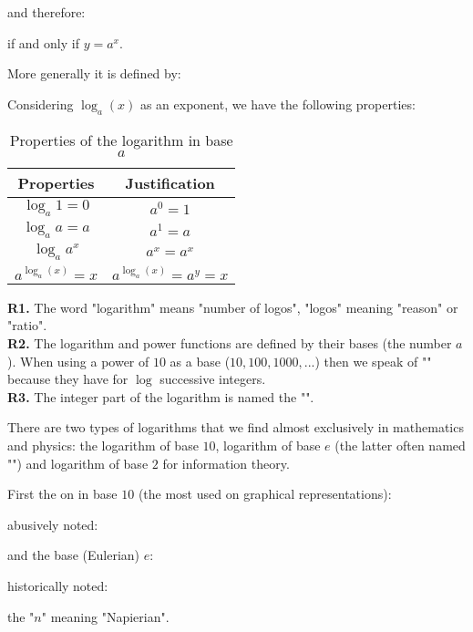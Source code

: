 	and therefore:
	
	if and only if $y=a^x$.
	
	More generally it is defined by:
	
	
	Considering $\log_a(x)$ as an exponent, we have the following properties:	
	\begin{table}[H]
	\begin{center}
		\begin{tabular}{|c|c|}
			  \hline
			  \rowcolor[gray]{0.75}Properties & Justification \\ \hline
			  $\log_a1=0$ & $a^0=1$ \\ \hline
			  $\log_aa=a$ & $a^1=a$ \\ \hline
			  $\log_aa^x$ & $a^x=a^x$ \\ \hline
			  $a^{\log_a(x)}=x$ & $a^{\log_a(x)}=a^y=x$ \\
			  \hline
		\end{tabular}
		\end{center}
		\caption{Properties of the logarithm in base $a$}
	\end{table}
	\begin{tcolorbox}[title=Remarks,colframe=black,arc=10pt]
	\textbf{R1.} The word "logarithm" means "number of logos", "logos" meaning "reason" or "ratio".\\
	
	\textbf{R2.} The logarithm and power functions are defined by their bases (the number $a$). When using a power of $10$ as a base ($10, 100, 1000, ...$) then we speak of "" because they have for $\log$ successive integers.\\
	
	\textbf{R3.} The integer part of the logarithm is named the "".
	\end{tcolorbox}
	There are two types of logarithms that we find almost exclusively in mathematics and physics: the logarithm of base $10$, logarithm of base $e$ (the latter often named "") and logarithm of base $2$ for information theory.
	
	First the on in base $10$ (the most used on graphical representations):
	
	abusively noted:
	
	and the base (Eulerian) $e$:
	
	historically noted:
	
	the "$n$" meaning "Napierian".
	
